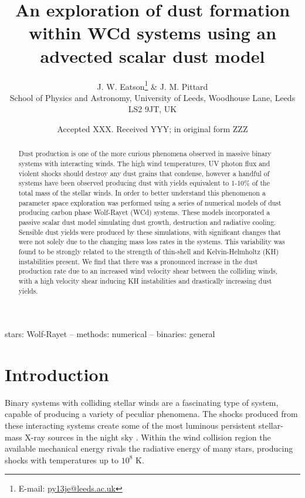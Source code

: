\documentclass[fleqn,usenatbib]{mnras}
\title[Dust formation simulations in WCd systems]{An exploration of dust formation within WCd systems using an advected scalar dust model}
\author[J. W. Eatson et al.]{
J. W. Eatson\thanks{E-mail: \href{mailto:py13je@leeds.ac.uk}{py13je@leeds.ac.uk}} \&
J. M. Pittard
\\
School of Physics and Astronomy, University of
       Leeds, Woodhouse Lane, Leeds LS2 9JT, UK\\  
}
\date{Accepted XXX. Received YYY; in original form ZZZ}
\begin{document}
\label{firstpage}
\pagerange{\pageref{firstpage}--\pageref{lastpage}}
\maketitle

\begin{abstract}
\noindent
Dust production is one of the more curious phenomena observed in massive binary systems with interacting winds.
The high wind temperatures, UV photon flux and violent shocks should destroy any dust grains that condense, however a handful of systems have been observed producing dust with yields equivalent to 1-10\% of the total mass of the stellar winds.
In order to better understand this phenomenon a parameter space exploration was performed using a series of numerical models of dust producing carbon phase Wolf-Rayet (WCd) systems.
These models incorporated a passive scalar dust model simulating dust growth, destruction and radiative cooling.
Sensible dust yields were produced by these simulations, with significant changes that were not solely due to the changing mass loss rates in the systems.
This variability was found to be strongly related to the strength of thin-shell and Kelvin-Helmholtz (KH) instabilities present.
We find that there was a pronounced increase in the dust production rate due to an increased wind velocity shear between the colliding winds, with a high velocity shear inducing KH instabilities and drastically increasing dust yields.

\end{abstract}

\begin{keywords}
stars: Wolf-Rayet -- methods: numerical -- binaries: general
\end{keywords}



\section{Introduction}

Binary systems with colliding stellar winds are a fascinating type of system, capable of producing a variety of peculiar phenomena.
The shocks produced from these interacting systems create some of the most luminous persistent stellar-mass X-ray sources in the night sky \citep{rossloweSpatialDistributionGalactic2015}.
Within the wind collision region the available mechanical energy rivals the radiative energy of many stars, producing shocks with temperatures up to $10^8$ \si{\kelvin}.
\end{document}
